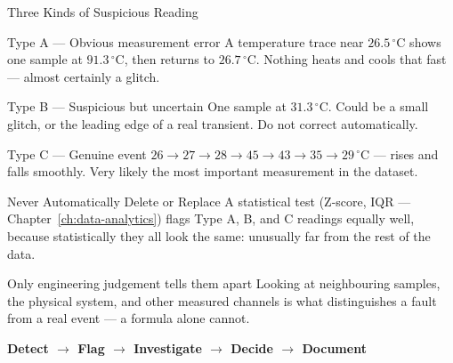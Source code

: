 \documentclass[9pt,aspectratio=169,xcolor=table]{beamer}
\begin{document}
\begin{frame}{Three Kinds of Suspicious Reading}
    \leavevmode
    \small
    \begin{block}{Type A --- Obvious measurement error}
        A temperature trace near $26.5\,^{\circ}\text{C}$ shows one
        sample at $91.3\,^{\circ}\text{C}$, then returns to
        $26.7\,^{\circ}\text{C}$. Nothing heats and cools that fast ---
        almost certainly a glitch.
    \end{block}

    \vspace{1mm}
    \begin{block}{Type B --- Suspicious but uncertain}
        One sample at $31.3\,^{\circ}\text{C}$. Could be a small
        glitch, or the leading edge of a real transient. \alert{Do not
        correct automatically.}
    \end{block}

    \vspace{1mm}
    \begin{block}{Type C --- Genuine event}
        $26 \to 27 \to 28 \to 45 \to 43 \to 35 \to 29\,^{\circ}\text{C}$
        --- rises and falls smoothly. Very likely the most important
        measurement in the dataset.
    \end{block}
\end{frame}

\begin{frame}{Never Automatically Delete or Replace}
    \leavevmode
    A statistical test (Z-score, IQR --- Chapter~\ref{ch:data-analytics})
    flags Type A, B, and C readings \alert{equally well}, because
    statistically they all look the same: unusually far from the rest
    of the data.

    \vspace{3mm}
    \begin{alertblock}{Only engineering judgement tells them apart}
        Looking at neighbouring samples, the physical system, and
        other measured channels is what distinguishes a fault from a
        real event --- a formula alone cannot.
    \end{alertblock}

    \vspace{3mm}
    \begin{center}
        \Large\color{primary}\textbf{Detect $\to$ Flag $\to$
        Investigate $\to$ Decide $\to$ Document}
    \end{center}
\end{frame}
\end{document}
